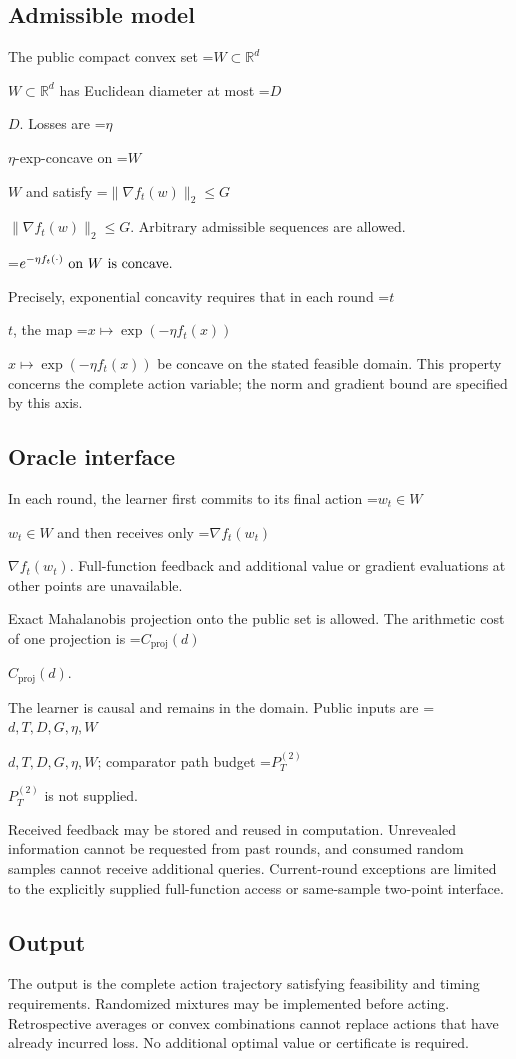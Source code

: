 \documentclass[10pt,a4paper]{article}
\newcommand{\AtlasMath}[1]{\par\begingroup\centering\setbox0=\hbox{$\displaystyle #1$}\ifdim\wd0>1.4\linewidth\typeout{ATLAS WIDE FORMULA: \the\wd0}\fi\ifdim\wd0>\linewidth\resizebox{\linewidth}{!}{\box0}\else\box0\fi\par\endgroup}
\newcommand{\AtlasInlineMath}[1]{\begingroup\setbox0=\hbox{$#1$}\ifdim\wd0>.4\linewidth\endgroup\AtlasMath{#1}\else\endgroup$#1$\fi}
\begin{document}
\subsection{Admissible model}
The public compact convex set \AtlasInlineMath{W\subset\mathbb{R}^d} has Euclidean diameter at most \AtlasInlineMath{D}. Losses are \AtlasInlineMath{\eta}-exp-concave on \AtlasInlineMath{W} and satisfy \AtlasInlineMath{\|\nabla f_t(w)\|_2\le G}. Arbitrary admissible sequences are allowed.


\AtlasMath{e^{-\eta f_t(\cdot)}\ \text{\text{on} }W\text{ \text{is concave}}.}


Precisely, exponential concavity requires that in each round \AtlasInlineMath{t}, the map \AtlasInlineMath{x\mapsto\exp(-\eta f_t(x))} be concave on the stated feasible domain. This property concerns the complete action variable; the norm and gradient bound are specified by this axis.

\subsection{Oracle interface}
In each round, the learner first commits to its final action \AtlasInlineMath{w_t\in W} and then receives only \AtlasInlineMath{\nabla f_t(w_t)}. Full-function feedback and additional value or gradient evaluations at other points are unavailable.

Exact Mahalanobis projection onto the public set is allowed. The arithmetic cost of one projection is \AtlasInlineMath{C_{\mathrm{proj}}(d)}.

The learner is causal and remains in the domain. Public inputs are \AtlasInlineMath{d,T,D,G,\eta,W}; comparator path budget \AtlasInlineMath{P_T^{(2)}} is not supplied.

Received feedback may be stored and reused in computation. Unrevealed information cannot be requested from past rounds, and consumed random samples cannot receive additional queries. Current-round exceptions are limited to the explicitly supplied full-function access or same-sample two-point interface.

\subsection{Output}
The output is the complete action trajectory satisfying feasibility and timing requirements. Randomized mixtures may be implemented before acting. Retrospective averages or convex combinations cannot replace actions that have already incurred loss. No additional optimal value or certificate is required.
\end{document}
